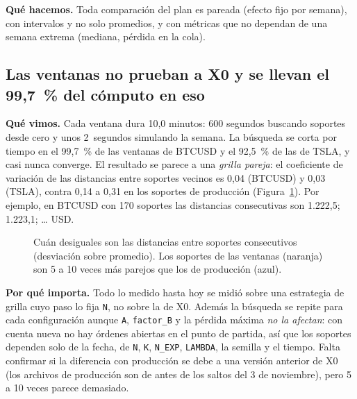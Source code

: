 \documentclass[11pt,a4paper]{article}
\newcommand{\code}[1]{\texttt{\small #1}}
\begin{document}
\textbf{Qué hacemos.} Toda comparación del plan es pareada (efecto fijo por semana), con intervalos y no solo
promedios, y con métricas que no dependan de una semana extrema (mediana, pérdida en la cola).

\subsection{Las ventanas no prueban a X0 y se llevan el 99,7~\% del cómputo en eso}
\textbf{Qué vimos.} Cada ventana dura 10,0 minutos: 600 segundos buscando soportes desde cero y unos 2~segundos
simulando la semana. La búsqueda se corta por tiempo en el 99,7~\% de las ventanas de BTCUSD y el 92,5~\% de
las de TSLA, y casi nunca converge. El resultado se parece a una \emph{grilla pareja}: el coeficiente de
variación de las distancias entre soportes vecinos es 0,04 (BTCUSD) y 0,03 (TSLA), contra 0,14 a 0,31 en los
soportes de producción (Figura~\ref{fig:cv}). Por ejemplo, en BTCUSD con 170 soportes las distancias
consecutivas son 1.222,5; 1.223,1; \ldots{} USD.

\begin{figure}[H]
\centering
{}
\caption{Cuán desiguales son las distancias entre soportes consecutivos (desviación sobre promedio). Los soportes
de las ventanas (naranja) son 5 a 10 veces más parejos que los de producción (azul).}
\label{fig:cv}
\end{figure}

\textbf{Por qué importa.} Todo lo medido hasta hoy se midió sobre una estrategia de grilla cuyo paso lo fija
\code{N}, no sobre la de X0. Además la búsqueda se repite para cada configuración aunque \code{A},
\code{factor\_B} y la pérdida máxima \emph{no la afectan}: con cuenta nueva no hay órdenes abiertas en el punto
de partida, así que los soportes dependen solo de la fecha, de \code{N}, \code{K}, \code{N\_EXP}, \code{LAMBDA},
la semilla y el tiempo. Falta confirmar si la diferencia con producción se debe a una versión anterior de X0
(los archivos de producción son de antes de los saltos del 3 de noviembre), pero 5 a 10 veces parece demasiado.
\end{document}
